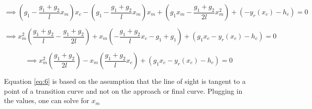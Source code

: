 \documentclass{article}
\begin{document}
    \begin{equation*}
        \implies \left ( g_{1} - \frac{g_{1} + g_{2}}{l}x_{m} \right ) x_{c} - \left ( g_{1} - \frac{g_{1} + g_{2}}{l}x_{m} \right ) x_{m} + \left ( g_{1}x_{m} - \frac{g_{1} + g_{2}}{2l}x_{m}^{2} \right ) + \left ( -y_{r}(x_{c}) - h_{c} \right ) = 0
    \end{equation*}
    
    \begin{equation*}
        \implies x_{m}^{2}\left ( \frac{g_{1} + g_{2}}{l} - \frac{g_{1} + g_{2}}{2l} \right ) + x_{m}\left ( -\frac{g_{1} + g_{2}}{l}x_{c} - g_{1} + g_{1} \right ) + \left ( g_{1}x_{c} - y_{r}(x_{c}) - h_{c} \right ) = 0
    \end{equation*}
    
    \begin{equation} \label{eq:6}
        \implies x_{m}^{2}\left ( \frac{g_{1} + g_{2}}{2l} \right ) - x_{m}\left ( \frac{g_{1} + g_{2}}{l}x_{c} \right ) + \left ( g_{1}x_{c} - y_{r}(x_{c}) - h_{c} \right ) = 0
    \end{equation}
    
    Equation \ref{eq:6} is based on the assumption that the line of sight is tangent to a point of a transition curve and not on the approach or final curve. Plugging in the values, one can solve for $x_{m}$
    
\end{document}

